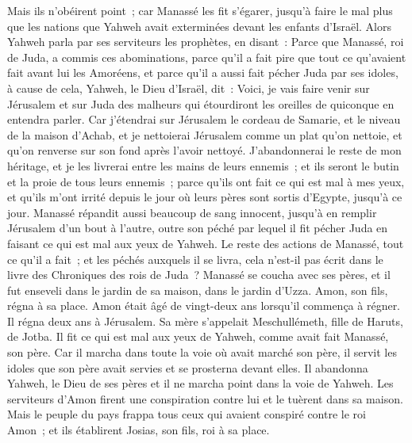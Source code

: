 \begin{multicols}{2}
Mais ils n'obéirent point~; car Manassé les fit s'égarer, jusqu'à faire le mal plus que les nations que Yahweh avait exterminées devant les enfants d'Israël.
Alors Yahweh parla par ses serviteurs les prophètes, en disant~:
Parce que Manassé, roi de Juda, a commis ces abominations, parce qu'il a fait pire que tout ce qu'avaient fait avant lui les Amoréens, et parce qu'il a aussi fait pécher Juda par ses idoles,
à cause de cela, Yahweh, le Dieu d'Israël, dit~: Voici, je vais faire venir sur Jérusalem et sur Juda des malheurs qui étourdiront les oreilles de quiconque en entendra parler.
Car j'étendrai sur Jérusalem le cordeau de Samarie, et le niveau de la maison d'Achab, et je nettoierai Jérusalem comme un plat qu'on nettoie, et qu’on renverse sur son fond après l'avoir nettoyé.
J'abandonnerai le reste de mon héritage, et je les livrerai entre les mains de leurs ennemis~; et ils seront le butin et la proie de tous leurs ennemis~;
parce qu'ils ont fait ce qui est mal à mes yeux, et qu'ils m'ont irrité depuis le jour où leurs pères sont sortis d'Egypte, jusqu'à ce jour.
Manassé répandit aussi beaucoup de sang innocent, jusqu'à en remplir Jérusalem d'un bout à l'autre, outre son péché par lequel il fit pécher Juda en faisant ce qui est mal aux yeux de Yahweh.
Le reste des actions de Manassé, tout ce qu'il a fait~; et les péchés auxquels il se livra, cela n'est-il pas écrit dans le livre des Chroniques des rois de Juda~?
Manassé se coucha avec ses pères, et il fut enseveli dans le jardin de sa maison, dans le jardin d'Uzza. Amon, son fils, régna à sa place.
Amon était âgé de vingt-deux ans lorsqu'il commença à régner. Il régna deux ans à Jérusalem. Sa mère s'appelait Meschullémeth, fille de Haruts, de Jotba.
Il fit ce qui est mal aux yeux de Yahweh, comme avait fait Manassé, son père.
Car il marcha dans toute la voie où avait marché son père, il servit les idoles que son père avait servies et se prosterna devant elles.
Il abandonna Yahweh, le Dieu de ses pères et il ne marcha point dans la voie de Yahweh.
Les serviteurs d'Amon firent une conspiration contre lui et le tuèrent dans sa maison.
Mais le peuple du pays frappa tous ceux qui avaient conspiré contre le roi Amon~; et ils établirent Josias, son fils, roi à sa place.

\end{multicols}
